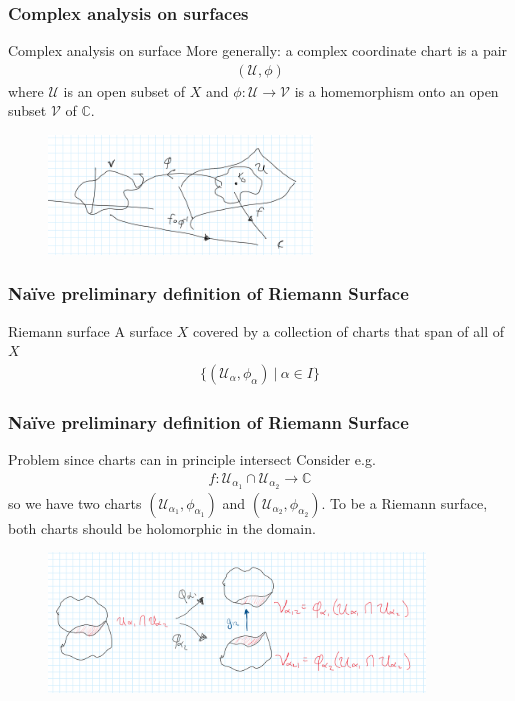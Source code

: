 \documentclass{beamer}[10]
\begin{document}
\begin{frame}
	\frametitle{Complex analysis on surfaces}
	\begin{block}{Complex analysis on surface}
		More generally: a complex coordinate chart is a pair
		\begin{equation}
			\begin{aligned}
				(\mathcal{U},\phi)
			\end{aligned}
		\end{equation}
	where $\mathcal{U}$ is an open subset of $X$ and $\phi:\mathcal{U}\to \mathcal{V}$ is a homemorphism onto an open subset $\mathcal{V}$ of $\mathds{C}$.
	\end{block}
\begin{figure}
	\includegraphics[width=7cm]{4}
\end{figure}
\end{frame}

\begin{frame}
	\frametitle{Naïve preliminary definition of Riemann Surface}
	\begin{block}{Riemann surface}
	A surface $X$ covered by a collection of charts that span of all of $X$
	\begin{equation}
		\begin{aligned}
			\{(\mathcal{U}_\alpha,\phi_\alpha)~\big|~\alpha\in I\}
		\end{aligned}
	\end{equation}
	\end{block}
\end{frame} 

\begin{frame}
	\frametitle{Naïve preliminary definition of Riemann Surface}
	\begin{block}{Problem since charts can in principle intersect}
		Consider e.g. 
		\begin{equation}
			\begin{aligned}
				f:\mathcal{U}_{\alpha_1}\cap \mathcal{U}_{\alpha_2}\to \mathds{C}
			\end{aligned}
		\end{equation}
	so we have two charts $(\mathcal{U}_{\alpha_1},\phi_{\alpha_1})$ and $(\mathcal{U}_{\alpha_2},\phi_{\alpha_2})$. To be a Riemann surface, both charts should be holomorphic in the domain.
	\end{block}
\begin{figure}
	\includegraphics[width=10cm]{5}
\end{figure}
\end{frame} 
\end{document}
